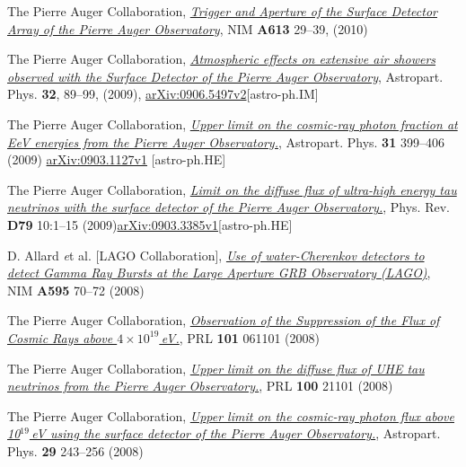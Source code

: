 \begin{etaremune}
\item {}The Pierre Auger Collaboration,
\href{http://dx.doi.org/10.1016/j.nima.2009.11.018}{\emph{Trigger and Aperture
of the Surface Detector Array of the Pierre Auger Observatory}}, NIM {\bf A613}
29--39, (2010)

\item {} The Pierre Auger Collaboration,
\href{http://dx.doi.org/10.1016/j.astropartphys.2009.06.004}{\emph{Atmospheric
effects on extensive air showers observed with the Surface Detector of the
Pierre Auger Observatory}}, Astropart. Phys. {\bf 32}, 89--99, (2009),
\href{http://arxiv.org/abs/0906.5497/}{arXiv:0906.5497v2}[astro-ph.IM]

\item {}The Pierre Auger Collaboration,
\href{http://dx.doi.org/10.1016/j.astropartphys.2009.04.003}{\emph{Upper limit
on the cosmic-ray photon fraction at EeV energies from the Pierre Auger
Observatory.}}, Astropart. Phys. {\bf 31} 399--406 (2009) 
\href{http://arxiv.org/abs/0903.1127/}{arXiv:0903.1127v1} [astro-ph.HE]

\item {}The Pierre Auger Collaboration,
\href{http://dx.doi.org/10.1103/PhysRevD.79.102001}{\emph{Limit on the diffuse
flux of ultra-high energy tau neutrinos with the surface detector of the Pierre
Auger Observatory.}}, Phys. Rev. {\bf D79} 10:1--15
(2009)\href{http://arxiv.org/abs/0903.3385/}{arXiv:0903.3385v1}[astro-ph.HE]

\item {}D. Allard {\emph et al.} [LAGO Collaboration],
\href{http://dx.doi.org/10.1016/j.nima.2008.07.041}{\emph{Use of
water-Cherenkov detectors to detect Gamma Ray Bursts at the Large Aperture GRB
Observatory (LAGO)}}, NIM {\bf A595} 70--72 (2008)

\item {}The Pierre Auger Collaboration,
\href{http://dx.doi.org/10.1103/PhysRevLett.101.061101}{\emph{Observation of
the Suppression of the Flux of Cosmic Rays above $4\times10^{19}$\,eV.}}, PRL
{\bf 101} 061101 (2008)

\item {}The Pierre Auger Collaboration,
\href{http://dx.doi.org/10.1103/PhysRevLett.100.211101}{\emph{Upper limit on
the diffuse flux of UHE tau neutrinos from the Pierre Auger Observatory.}}, PRL
{\bf 100} 21101 (2008)

\item {}The Pierre Auger Collaboration,
\href{http://dx.doi.org/10.1016/j.astropartphys.2008.01.003}{\emph{Upper limit
on the cosmic-ray photon flux above 10$^{19}$\,eV using the surface detector of
the Pierre Auger Observatory.}}, Astropart. Phys. {\bf 29} 243--256 (2008)


\end{etaremune}
